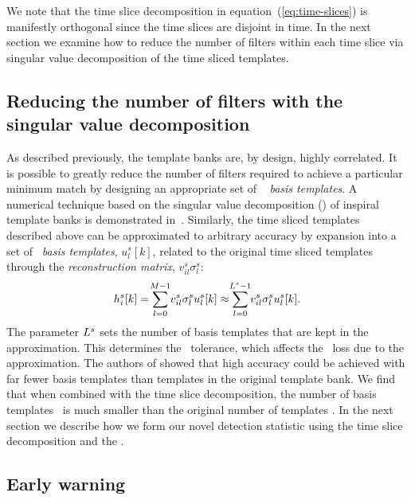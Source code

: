 We note that the time slice decomposition in equation~(\ref{eq:time-slices}) is
manifestly orthogonal since the time slices are disjoint in time.  In the next
section we examine how to reduce the number of filters within each time slice
via singular value decomposition of the time sliced templates.

\subsection{Reducing the number of filters with the singular value
decomposition}

As described previously, the template banks are, by design, highly correlated.
It is possible to greatly reduce the number of filters required to achieve a
particular minimum match by designing an appropriate set of \SVD\ {\em
basis templates}.  A numerical technique based on the singular value
decomposition (\SVD) of inspiral template banks is demonstrated
in~\cite{Cannon:2010p10398}.  Similarly, the time sliced templates described
above can be approximated to arbitrary accuracy by expansion into a set of
\SVD\ \emph{basis templates}, $u_l^s[k]$, related to the original time
sliced templates through the \emph{reconstruction matrix},
$v_{il}^s\sigma_l^s$:
%
\begin{equation}
h_i^s[k] = \sum_{\mathclap{l=0}}^{\mathclap{M-1}} v_{il}^s \sigma_l^s u_l^s[k] \approx \sum_{\mathclap{l=0}}^{\mathclap{L^s-1}} v_{il}^s \sigma_l^s u_l^s[k].
\label{eq:svddecomp}
\end{equation}
%
%
%
The parameter $L^s$ sets the number of basis templates that are kept in
the approximation.  This determines the \SVD\ tolerance, which affects the
\SNR\ loss due to the approximation.  The authors of \cite{Cannon:2010p10398}
showed that high accuracy could be achieved with far fewer basis templates than
templates in the original template bank.  We find that when combined with the
time slice decomposition, the number of basis templates \numsvdtmps\ is much
smaller than the original number of templates \numtmps.  In the next section we
describe how we form our novel detection statistic using the time slice
decomposition and the \SVD.

\subsection{Early warning \SNR }

